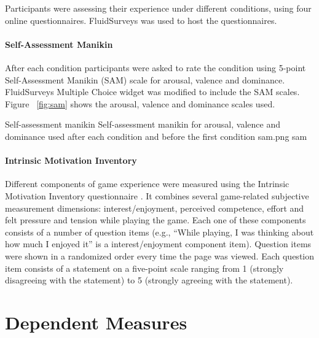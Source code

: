 Participants were assessing their experience under different conditions, using four online questionnaires. \textregistered FluidSurveys was used to host the questionnaires.

\paragraph{Self-Assessment Manikin} After each condition participants were asked to rate the condition using 5-point Self-Assessment Manikin (SAM) \cite{bradley1994measuring} scale for arousal, valence and dominance. \textregistered FluidSurveys Multiple Choice widget was modified to include the SAM scales. Figure ~\ref{fig:sam} shows the arousal, valence and dominance scales used.

\largeimg
{Self-assessment manikin}
{Self-assessment manikin for arousal, valence and dominance used after each condition and before the first condition}
{sam.png}
{sam}

\paragraph{Intrinsic Motivation Inventory} Different components of game experience were measured using the Intrinsic Motivation Inventory questionnaire \cite{ryan1983relation}. It combines several game-related subjective measurement dimensions: interest/enjoyment, perceived competence, effort and felt pressure and tension while playing the game. Each one of these components consists of a number of question items (e.g., ``While playing, I was thinking about how much I enjoyed it'' is a interest/enjoyment component item). Question items were shown in a randomized order every time the page was viewed. Each question item consists of a statement on a five-point scale ranging from 1 (strongly disagreeing with the statement) to 5 (strongly agreeing with the statement).



\section{Dependent Measures}

